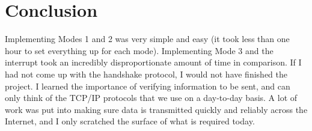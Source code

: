 \documentclass{article}
\begin{document}
\section{Conclusion}
Implementing Modes 1 and 2 was very simple and easy (it took
less than one hour to set everything up for each mode).
Implementing Mode 3 and the interrupt took an incredibly
disproportionate amount of time in comparison.
If I had not come up with
the handshake protocol, I would not have finished the project.
I learned the importance of verifying information to be sent,
and can only think of the TCP/IP protocols that we use on a
day-to-day basis. A lot of work was put into making sure
data is transmitted quickly and reliably across the Internet,
and I only scratched the surface of what is required today.
\end{document}
